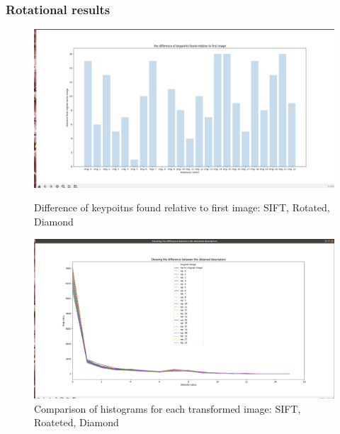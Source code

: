 \documentclass[conference]{IEEEtran}
\begin{document}
\subsubsection{Rotational results}

\begin{figure}[!htb]
  \centering
  \begin{minipage}[t]{0.45\textwidth}
    \includegraphics[width=\textwidth]{../programme/results/Task_1/rotated_experiements/SIFT/diamond/experiment_one_difference_found_kp.png}
    
    \caption{Difference of keypoitns found relative to first image: SIFT, Rotated, Diamond}
    \label{Difference of keypoitns found relative to first image: SIFT, Rotated, Diamond}
  \end{minipage}
  \hfill
  \begin{minipage}[t]{0.45\textwidth}
    \includegraphics[width=\textwidth]{../programme/results/Task_1/rotated_experiements/SIFT/diamond/experiment_two_plotting_histograms.png}
    \caption{Comparison of histograms for each transformed image: SIFT, Roateted, Diamond}
    \label{Comparison of histograms for each transformed image: SIFT, Roateted, Diamond}
  \end{minipage}
\end{figure}
\end{document}
